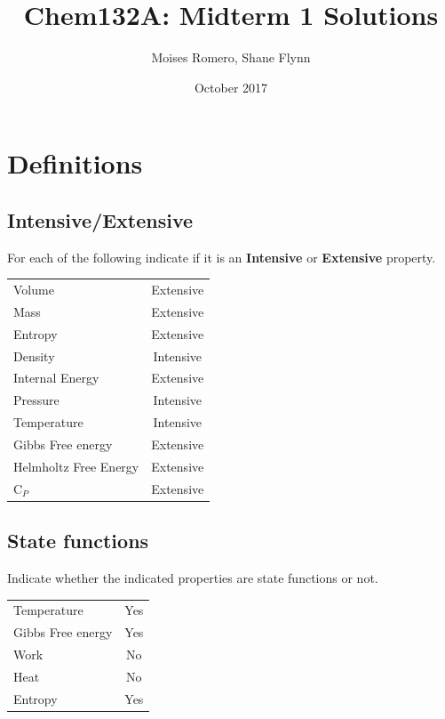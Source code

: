 \documentclass{article}
\title{Chem132A: Midterm 1 Solutions}
\author{Moises Romero, Shane Flynn}
\date{October 2017}
\begin{document}
\maketitle


\section{Definitions}
\subsection*{Intensive/Extensive}
For each of the following indicate if it is an \textbf{Intensive} or \textbf{Extensive} property.

\bigskip

\begin{tabular}{ l | c }
    Volume & Extensive\\
    Mass & Extensive\\
    Entropy & Extensive\\
    Density & Intensive\\
    Internal Energy & Extensive\\
    Pressure & Intensive\\
    Temperature & Intensive\\
    Gibbs Free energy & Extensive\\
    Helmholtz Free Energy & Extensive\\
    C$_P$ & Extensive\\
\end{tabular}

\subsection*{State functions}
Indicate whether the indicated properties are state functions or not.

\bigskip

\begin{tabular}{ l | c }
    Temperature & Yes\\
    Gibbs Free energy & Yes\\
    Work & No\\
    Heat & No\\
    Entropy & Yes\\
\end{tabular}

\newpage
\end{document}
